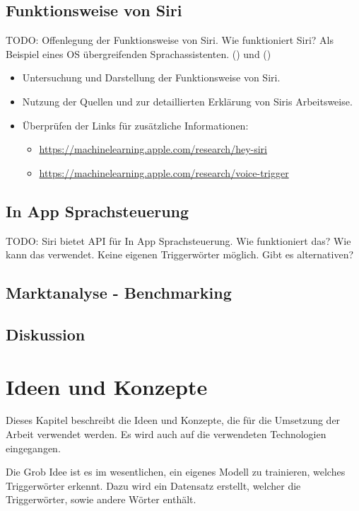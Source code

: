 \documentclass[11pt,a4paper]{article}
\begin{document}
\subsection{Funktionsweise von Siri}
TODO: Offenlegung der Funktionsweise von Siri. Wie funktioniert Siri? Als Beispiel eines OS 
übergreifenden Sprachassistenten.
(\cite{siri2017hey}) und (\cite{apple2023voice}) 

\begin{itemize}
    \item Untersuchung und Darstellung der Funktionsweise von Siri.
    \item Nutzung der Quellen \cite{siri2017hey} und \cite{apple2023voice} zur detaillierten 
    Erklärung von Siris Arbeitsweise.
    \item Überprüfen der Links für zusätzliche Informationen:
    \begin{itemize}
        \item \url{https://machinelearning.apple.com/research/hey-siri}
        \item \url{https://machinelearning.apple.com/research/voice-trigger}
    \end{itemize}
\end{itemize}

\subsection{In App Sprachsteuerung}
TODO: Siri bietet API für In App Sprachsteuerung. Wie funktioniert das? Wie kann das verwendet.
Keine eigenen Triggerwörter möglich. Gibt es alternativen?

\subsection{Marktanalyse - Benchmarking}

\subsection{Diskussion}



\newpage \section{Ideen und Konzepte}
Dieses Kapitel beschreibt die Ideen und Konzepte, die für die Umsetzung der Arbeit verwendet
werden. Es wird auch auf die verwendeten Technologien eingegangen.

Die Grob Idee ist es im wesentlichen, ein eigenes Modell zu trainieren, welches Triggerwörter
erkennt. Dazu wird ein Datensatz erstellt, welcher die Triggerwörter, sowie andere Wörter
enthält.
\end{document}
